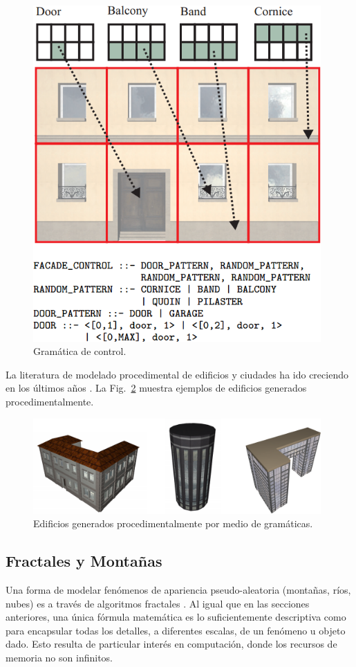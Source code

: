 \begin{figure}
\center
\includegraphics[width=11cm]{figures/controlgrammar}
\caption{Gramática de control.}
\label{fg:controlgrammar}
\end{figure}

La literatura de modelado procedimental de edificios y ciudades ha ido creciendo en los últimos años \cite{Parish2001,Muller2006}.
La Fig.~\ref{fg:edificios} muestra ejemplos de edificios generados procedimentalmente.


\begin{figure}
\center
\includegraphics[width=11cm]{figures/edificios}
\caption{Edificios generados procedimentalmente por medio de gramáticas.}
\label{fg:edificios}
\end{figure}

\subsection{Fractales y Montañas}
Una forma de modelar fenómenos de apariencia pseudo-aleatoria (montañas, ríos, nubes) es a través de algoritmos fractales \cite{Mandelbrot1983}.
Al igual que en las secciones anteriores, una única fórmula matemática es lo suficientemente descriptiva como para encapsular todas los detalles, a diferentes escalas, de un fenómeno u objeto dado.
Esto resulta de particular interés en computación, donde los recursos de memoria no son infinitos.

